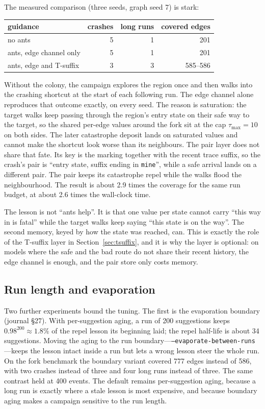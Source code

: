 \documentclass[11pt,a4paper]{article}
\newcommand{\Tau}{\tau_{\max}}
\begin{document}
The measured comparison (three seeds, graph seed 7) is stark:

\begin{center}
\small
\begin{tabular}{@{}lrrr@{}}
\toprule
guidance & crashes & long runs & covered edges \\
\midrule
no ants & 5 & 1 & 201 \\
ants, edge channel only & 5 & 1 & 201 \\
ants, edge and T-suffix & 3 & 3 & 585--586 \\
\bottomrule
\end{tabular}
\end{center}

Without the colony, the campaign explores the region once and then walks into
the crashing shortcut at the start of each following run.  The edge channel
alone reproduces that outcome exactly, on every seed.  The reason is
saturation: the target walks keep passing through the region's entry state on
their safe way to the target, so the shared per-edge values around the fork
sit at the cap $\Tau=10$ on both sides.  The later catastrophe deposit lands
on saturated values and cannot make the shortcut look worse than its
neighbours.  The pair layer does not share that fate.  Its key is the marking
together with the recent trace suffix, so the crash's pair is ``entry state,
suffix ending in \texttt{mine}'', while a safe arrival lands on a different
pair.  The pair keeps its catastrophe repel while the walks flood the
neighbourhood.  The result is about 2.9 times the coverage for the same run
budget, at about 2.6 times the wall-clock time.

The lesson is not ``ants help''.  It is that one value per state cannot carry
``this way in is fatal'' while the target walks keep saying ``this state is on
the way''.  The second memory, keyed by how the state was reached, can.  This
is exactly the role of the T-suffix layer in Section~\ref{sec:tsuffix}, and it
is why the layer is optional: on models where the safe and the bad route do
not share their recent history, the edge channel is enough, and the pair store
only costs memory.

\subsection{Run length and evaporation}

Two further experiments bound the tuning.  The first is the evaporation
boundary (journal \S27).  With per-suggestion aging, a run of 200 suggestions
keeps $0.98^{200}\approx1.8\%$ of the repel lesson its beginning laid; the
repel half-life is about 34 suggestions.  Moving the aging to the run
boundary---\texttt{--evaporate-between-runs}---keeps the lesson intact inside
a run but lets a wrong lesson steer the whole run.  On the fork benchmark the
boundary variant covered 777 edges instead of 586, with two crashes instead of
three and four long runs instead of three.  The same contrast held at 400
events.  The default remains per-suggestion aging, because a long run is
exactly where a stale lesson is most expensive, and because boundary aging
makes a campaign sensitive to the run length.
\end{document}
